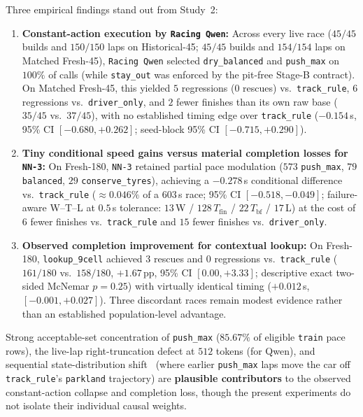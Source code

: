 \documentclass[11pt,a4paper]{article}
\begin{document}
Three empirical findings stand out from Study~2:
\begin{enumerate}[leftmargin=1.5em,itemsep=2pt]
  \item \textbf{Constant-action execution by \texttt{Racing Qwen}:} Across every live race ($45/45$ builds and $150/150$ laps on Historical-45; $45/45$ builds and $154/154$ laps on Matched Fresh-45), \texttt{Racing Qwen} selected \texttt{dry\_balanced} and \texttt{push\_max} on $100\%$ of calls (while \texttt{stay\_out} was enforced by the pit-free Stage-B contract). On Matched Fresh-45, this yielded $5$ regressions ($0$ rescues) vs.\ \texttt{track\_rule}, $6$ regressions vs.\ \texttt{driver\_only}, and $2$ fewer finishes than its own raw base ($35/45$ vs.\ $37/45$), with no established timing edge over \texttt{track\_rule} ($-0.154$\,s, 95\% CI $[-0.680, +0.262]$; seed-block 95\% CI $[-0.715, +0.290]$).
  \item \textbf{Tiny conditional speed gains versus material completion losses for \texttt{NN-3}:} On Fresh-180, \texttt{NN-3} retained partial pace modulation ($573$ \texttt{push\_max}, $79$ \texttt{balanced}, $29$ \texttt{conserve\_tyres}), achieving a $-0.278$\,s conditional difference vs.\ \texttt{track\_rule} ($\approx 0.046\%$ of a $603$\,s race; 95\% CI $[-0.518, -0.049]$; failure-aware W--T--L at $0.5$\,s tolerance: $13$\,W / $128$\,$T_{\text{fin}}$ / $22$\,$T_{\text{bf}}$ / $17$\,L) at the cost of $6$ fewer finishes vs.\ \texttt{track\_rule} and $15$ fewer finishes vs.\ \texttt{driver\_only}.
  \item \textbf{Observed completion improvement for contextual lookup:} On Fresh-180, \texttt{lookup\_9cell} achieved $3$ rescues and $0$ regressions vs.\ \texttt{track\_rule} ($161/180$ vs.\ $158/180$, $+1.67$\,pp, 95\% CI $[0.00, +3.33]$; descriptive exact two-sided McNemar $p = 0.25$) with virtually identical timing ($+0.012$\,s, $[-0.001, +0.027]$). Three discordant races remain modest evidence rather than an established population-level advantage.
\end{enumerate}

Strong acceptable-set concentration of \texttt{push\_max} ($85.67\%$ of eligible \texttt{train} pace rows), the live-lap right-truncation defect at $512$ tokens (for Qwen), and sequential state-distribution shift~\cite{ross2011dagger} (where earlier \texttt{push\_max} laps move the car off \texttt{track\_rule}'s \texttt{parkland} trajectory) are \textbf{plausible contributors} to the observed constant-action collapse and completion loss, though the present experiments do not isolate their individual causal weights.
\end{document}
